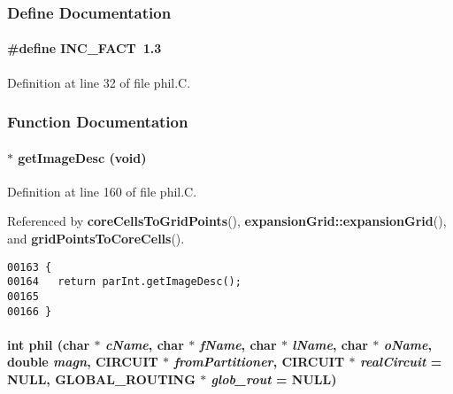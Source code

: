 \subsubsection{Define Documentation}
\label{phil.C_a0}
\paragraph{\setlength{\rightskip}{0pt plus 5cm}\#define INC\_\-FACT\ 1.3}\hfill



Definition at line 32 of file phil.C.

\subsubsection{Function Documentation}
\label{phil.C_a3}
\paragraph{ $\ast$ get\-Image\-Desc (void)}\hfill



Definition at line 160 of file phil.C.

Referenced by {\bf core\-Cells\-To\-Grid\-Points}(), {\bf expansion\-Grid::expansion\-Grid}(), and {\bf grid\-Points\-To\-Core\-Cells}().\small\begin{verbatim}00163 {
00164   return parInt.getImageDesc();
00165 
00166 }
\end{verbatim}\normalsize 
\label{phil.C_a1}
\paragraph{\setlength{\rightskip}{0pt plus 5cm}int phil (char $\ast$ {\em c\-Name}, char $\ast$ {\em f\-Name}, char $\ast$ {\em l\-Name}, char $\ast$ {\em o\-Name}, double {\em magn}, CIRCUIT $\ast$ {\em from\-Partitioner}, CIRCUIT $\ast$ {\em real\-Circuit} = NULL, {\bf GLOBAL\_\-ROUTING} $\ast$ {\em glob\_\-rout} = NULL)}\hfill



